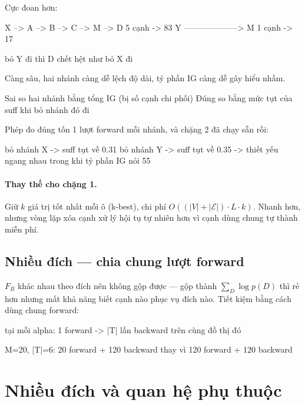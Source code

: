 \documentclass[11pt,a4paper]{article}
\begin{document}
Cực đoan hơn:

\begin{dia}
X --> A --> B --> C --> M --> D        5 cạnh  ->  83%
Y --------------------> M               1 cạnh  ->  17%

bỏ Y đi thì D chết hệt như bỏ X đi
\end{dia}

Càng sâu, hai nhánh càng dễ lệch độ dài, tỷ phần IG càng dễ gây hiểu nhầm.

\begin{dia}
Sai    so hai nhánh bằng tổng IG       (bị số cạnh chi phối)
Đúng   so bằng mức tụt của suff khi bỏ nhánh đó đi
\end{dia}

Phép đo đúng tốn 1 lượt forward mỗi nhánh, và chặng 2 đã chạy sẵn rồi:

\begin{dia}
bỏ nhánh X  ->  suff tụt về 0.31
bỏ nhánh Y  ->  suff tụt về 0.35      -> thiết yếu ngang nhau
trong khi tỷ phần IG nói 55%
\end{dia}

\paragraph{Thay thế cho chặng 1.} Giữ $k$ giá trị tốt nhất mỗi ô (k-best), chi phí $O((|V|+|\mathcal{E}|)\cdot L\cdot k)$. Nhanh hơn, nhưng vòng lặp xóa cạnh xử lý hội tụ tự nhiên hơn vì cạnh dùng chung tự thành miễn phí.

\subsection{Nhiều đích --- chia chung lượt forward}

$F_B$ khác nhau theo đích nên không gộp được --- gộp thành $\sum_D \log p(D)$ thì rẻ hơn nhưng mất khả năng biết cạnh nào phục vụ đích nào. Tiết kiệm bằng cách dùng chung forward:

\begin{dia}
tại mỗi alpha:   1 forward  ->  |T| lần backward trên cùng đồ thị đó

M=20, |T|=6:   20 forward + 120 backward
     thay vì   120 forward + 120 backward
\end{dia}


\section{Nhiều đích và quan hệ phụ thuộc}
\end{document}
